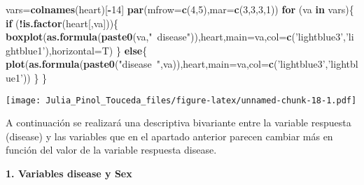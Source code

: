 \documentclass[]{article}
\newenvironment{Shaded}{\begin{snugshade}}{\end{snugshade}}
\newcommand{\KeywordTok}[1]{\textcolor[rgb]{0.13,0.29,0.53}{\textbf{#1}}}
\newcommand{\DataTypeTok}[1]{\textcolor[rgb]{0.13,0.29,0.53}{#1}}
\newcommand{\DecValTok}[1]{\textcolor[rgb]{0.00,0.00,0.81}{#1}}
\newcommand{\StringTok}[1]{\textcolor[rgb]{0.31,0.60,0.02}{#1}}
\newcommand{\CommentTok}[1]{\textcolor[rgb]{0.56,0.35,0.01}{\textit{#1}}}
\newcommand{\ControlFlowTok}[1]{\textcolor[rgb]{0.13,0.29,0.53}{\textbf{#1}}}
\newcommand{\OperatorTok}[1]{\textcolor[rgb]{0.81,0.36,0.00}{\textbf{#1}}}
\newcommand{\NormalTok}[1]{#1}
\begin{document}
\begin{Shaded}
\begin{Highlighting}[]
\NormalTok{vars=}\KeywordTok{colnames}\NormalTok{(heart)[}\OperatorTok{-}\DecValTok{14}\NormalTok{]}
\KeywordTok{par}\NormalTok{(}\DataTypeTok{mfrow=}\KeywordTok{c}\NormalTok{(}\DecValTok{4}\NormalTok{,}\DecValTok{5}\NormalTok{),}\DataTypeTok{mar=}\KeywordTok{c}\NormalTok{(}\DecValTok{3}\NormalTok{,}\DecValTok{3}\NormalTok{,}\DecValTok{3}\NormalTok{,}\DecValTok{1}\NormalTok{))}
\ControlFlowTok{for}\NormalTok{ (va }\ControlFlowTok{in}\NormalTok{ vars)\{}
  \ControlFlowTok{if}\NormalTok{ (}\OperatorTok{!}\KeywordTok{is.factor}\NormalTok{(heart[,va]))\{}
    \KeywordTok{boxplot}\NormalTok{(}\KeywordTok{as.formula}\NormalTok{(}\KeywordTok{paste0}\NormalTok{(va,}\StringTok{"~disease"}\NormalTok{)),heart,}\DataTypeTok{main=}\NormalTok{va,}\DataTypeTok{col=}\KeywordTok{c}\NormalTok{(}\StringTok{'lightblue3'}\NormalTok{,}\StringTok{'lightblue1'}\NormalTok{),}\DataTypeTok{horizontal=}\NormalTok{T)}
\NormalTok{  \} }\ControlFlowTok{else}\NormalTok{\{}
    \KeywordTok{plot}\NormalTok{(}\KeywordTok{as.formula}\NormalTok{(}\KeywordTok{paste0}\NormalTok{(}\StringTok{"disease~"}\NormalTok{,va)),heart,}\DataTypeTok{main=}\NormalTok{va,}\DataTypeTok{col=}\KeywordTok{c}\NormalTok{(}\StringTok{'lightblue3'}\NormalTok{,}\StringTok{'lightblue1'}\NormalTok{))}
\NormalTok{  \}}
\NormalTok{\}}
\end{Highlighting}
\end{Shaded}

\texttt{[image: Julia\_Pinol\_Touceda\_files/figure-latex/unnamed-chunk-18-1.pdf]}

A continuación se realizará una descriptiva bivariante entre la variable
respuesta (disease) y las variables que en el apartado anterior parecen
cambiar más en función del valor de la variable respuesta disease.

\textbf{1. Variables disease y Sex}

\begin{Shaded}
\end{Shaded}
\end{document}
